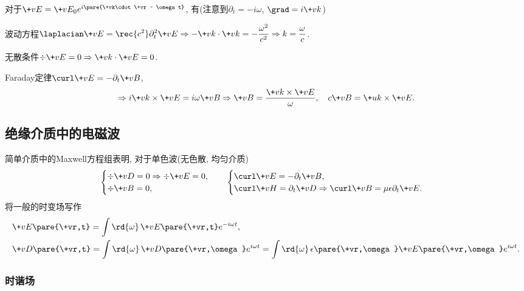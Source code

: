 \documentclass[hidelinks]{ctexart}
\begin{document}
\begin{sample}
    \begin{ex}
        对于$\+vE = \+vE_0 e^{i\pare{\+vk\cdot \+vr - \omega t}}$, 有(注意到$\partial_t = -i\omega$, $\grad = i\+vk$)
        \begin{cenum}
            \item 波动方程$\displaystyle \laplacian \+vE = \rec{c^2} \partial_t^2 \+vE \Rightarrow -\+vk\cdot \+vk = -\frac{\omega^2}{c^2} \Rightarrow k = \frac{\omega}{c}$.
            \item 无散条件$\div \+vE = 0 \Rightarrow \+vk\cdot \+vE = 0$.
            \item Faraday定律$\curl \+vE = -\partial_t \+vB$,
            \[ \Rightarrow i\+vk\times \+vE = i\omega \+vB \Rightarrow \+vB = \frac{\+vk\times \+vE}{\omega},\quad c\+vB = \+uk \times \+vE. \]
        \end{cenum}
    \end{ex}
\end{sample}




\subsection{绝缘介质中的电磁波} %
\label{sub:绝缘介质中的电磁波}

简单介质中的Maxwell方程组表明, 对于单色波(无色散, 均匀介质)
\[ \begin{cases}
    \div \+vD = 0 \Rightarrow \div \+vE = 0, \\
    \div \+vB = 0,
\end{cases}\quad \begin{cases}
    \curl \+vE = -\partial_t \+vB, \\
    \curl \+vH = \partial_t \+vD \Rightarrow \curl \+vB = \mu\epsilon \partial_t \+vE.
\end{cases} \]
将一般的时变场写作
\begin{align*}
    & \+vE\pare{\+vr,t} = \int \rd{\omega}\, \+vE\pare{\+vr,t} e^{-i\omega t}, \\
    & \+vD\pare{\+vr,t} = \int \rd{\omega}\, \+vD\pare{\+vr,\omega} e^{i\omega t} = \int \rd{\omega}\, \epsilon\pare{\+vr,\omega}\+vE\pare{\+vr,\omega} e^{i\omega t}.
\end{align*}

\subsubsection{时谐场} %
\label{ssub:时谐场}
\end{document}
